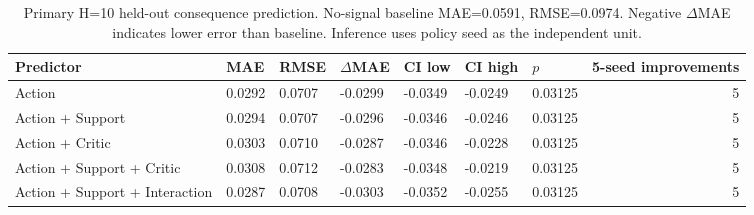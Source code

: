 \begin{table}
\caption{Primary H=10 held-out consequence prediction. No-signal baseline MAE=0.0591, RMSE=0.0974. Negative $\Delta$MAE indicates lower error than baseline. Inference uses policy seed as the independent unit.}
\label{tab:p1_primary_prediction}
\begin{tabular}{lllllllr}
\toprule
Predictor & MAE & RMSE & $\Delta$MAE & CI low & CI high & $p$ & 5-seed improvements \\
\midrule
Action & 0.0292 & 0.0707 & -0.0299 & -0.0349 & -0.0249 & 0.03125 & 5 \\
Action + Support & 0.0294 & 0.0707 & -0.0296 & -0.0346 & -0.0246 & 0.03125 & 5 \\
Action + Critic & 0.0303 & 0.0710 & -0.0287 & -0.0346 & -0.0228 & 0.03125 & 5 \\
Action + Support + Critic & 0.0308 & 0.0712 & -0.0283 & -0.0348 & -0.0219 & 0.03125 & 5 \\
Action + Support + Interaction & 0.0287 & 0.0708 & -0.0303 & -0.0352 & -0.0255 & 0.03125 & 5 \\
\bottomrule
\end{tabular}
\end{table}
